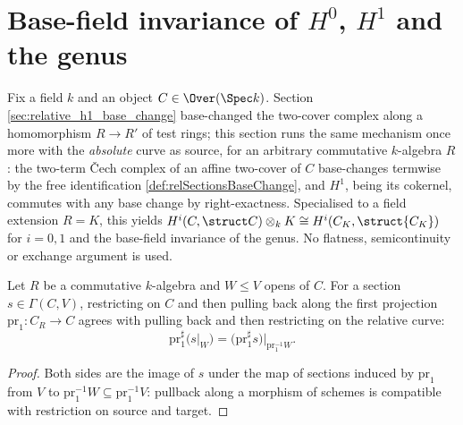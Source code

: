 \section{Base-field invariance of \(H^0\), \(H^1\) and the genus}
\label{sec:h1_base_field_invariance}

Fix a field \(k\) and an object \(C \in \Over(\Spec k)\). Section
\ref{sec:relative_h1_base_change} base-changed the two-cover complex along a
homomorphism \(R \to R'\) of test rings; this section runs the same mechanism once more
with the \emph{absolute} curve as source, for an arbitrary commutative \(k\)-algebra
\(R\): the two-term \v{C}ech complex of an affine two-cover of \(C\) base-changes
termwise by the free identification \ref{def:relSectionsBaseChange}, and \(H^1\), being
its cokernel, commutes with any base change by right-exactness. Specialised to a field
extension \(R = K\), this yields \(H^i(C, \struct C) \otimes_k K \cong
H^i(C_K, \struct{C_K})\) for \(i = 0, 1\) and the base-field invariance of the genus.
No flatness, semicontinuity or exchange argument is used.

\begin{lemma}
  \label{lem:relPullbackSection_resHom}
  \leanok
  Let \(R\) be a commutative \(k\)-algebra and \(W \leq V\) opens of \(C\). For a
  section \(s \in \Gamma(C, V)\), restricting on \(C\) and then pulling back along the
  first projection \(\mathrm{pr}_1 : C_R \to C\) agrees with pulling back and then
  restricting on the relative curve:
  \[
    \mathrm{pr}_1^{\sharp}\bigl(s|_W\bigr)
      = \bigl(\mathrm{pr}_1^{\sharp} s\bigr)\big|_{\mathrm{pr}_1^{-1} W}.
  \]
\end{lemma}
\begin{proof}
  \leanok
  Both sides are the image of \(s\) under the map of sections induced by
  \(\mathrm{pr}_1\) from \(V\) to \(\mathrm{pr}_1^{-1}W \subseteq \mathrm{pr}_1^{-1}V\):
  pullback along a morphism of schemes is compatible with restriction on source and
  target.
\end{proof}

